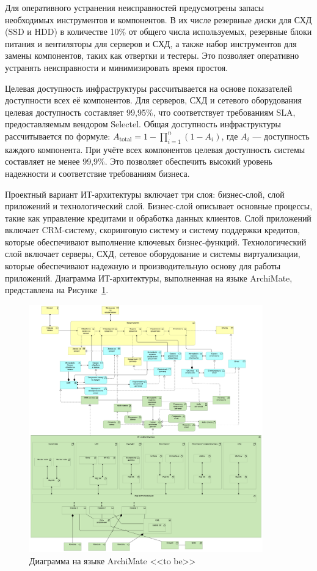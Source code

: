 \documentclass[14pt, a4paper]{extarticle}
\begin{document}
Для оперативного устранения неисправностей предусмотрены запасы необходимых инструментов и компонентов. В их числе резервные диски для СХД (SSD и HDD) в количестве 10\% от общего числа используемых, резервные блоки питания и вентиляторы для серверов и СХД, а также набор инструментов для замены компонентов, таких как отвертки и тестеры. Это позволяет оперативно устранять неисправности и минимизировать время простоя.

Целевая доступность инфраструктуры рассчитывается на основе показателей доступности всех её компонентов. Для серверов, СХД и сетевого оборудования целевая доступность составляет 99,95\%, что соответствует требованиям SLA, предоставляемым вендором Selectel. Общая доступность инфраструктуры рассчитывается по формуле: \(A_{\text{total}} = 1 - \prod_{i=1}^{n} (1 - A_i)\), где \(A_i\) — доступность каждого компонента. При учёте всех компонентов целевая доступность системы составляет не менее 99,9\%. Это позволяет обеспечить высокий уровень надежности и соответствие требованиям бизнеса.

Проектный вариант ИТ-архитектуры включает три слоя: бизнес-слой, слой приложений и технологический слой. Бизнес-слой описывает основные процессы, такие как управление кредитами и обработка данных клиентов. Слой приложений включает CRM-систему, скоринговую систему и систему поддержки кредитов, которые обеспечивают выполнение ключевых бизнес-функций. Технологический слой включает серверы, СХД, сетевое оборудование и системы виртуализации, которые обеспечивают надежную и производительную основу для работы приложений. Диаграмма ИТ-архитектуры, выполненная на языке ArchiMate, представлена на Рисунке~\ref{fig:archi_tobe}.

\begin{figure}[H]
  \centering
  \includegraphics[width=0.9\textwidth]{archi_tobe.png}
  \caption{Диаграмма на языке ArchiMate <<to be>>}
  \label{fig:archi_tobe}
\end{figure}
\end{document}
